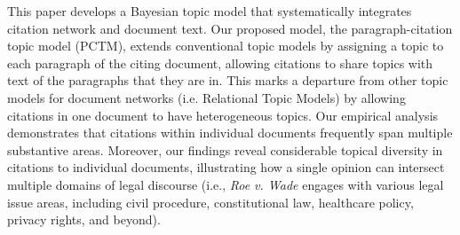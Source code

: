 This paper develops a Bayesian topic model that systematically integrates citation network and document text. 
Our proposed model, the paragraph-citation topic model (PCTM), extends conventional topic models by assigning a topic to each paragraph of the citing document, allowing citations to share topics with text of the paragraphs that they are in. 
This marks a departure from other topic models for document networks (i.e. Relational Topic Models) by allowing citations in one document to have heterogeneous topics. 
Our empirical analysis demonstrates that citations within individual documents frequently span multiple substantive areas. 
Moreover, our findings reveal considerable topical diversity in citations to individual documents, illustrating how a single opinion can intersect multiple domains of legal discourse (i.e., \textit{Roe v. Wade} engages with various legal issue areas, including civil procedure, constitutional law, healthcare policy, privacy rights, and beyond).

